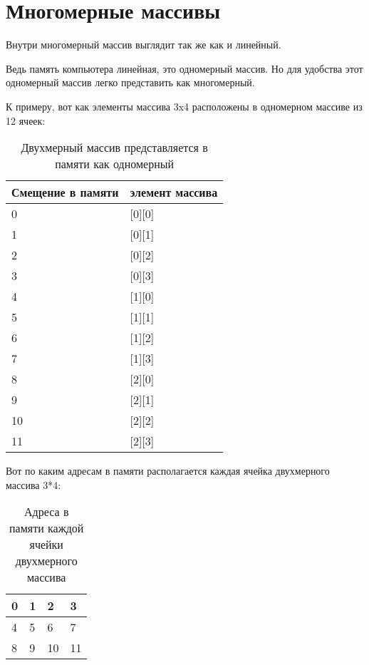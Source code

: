 \section{Многомерные массивы}

Внутри многомерный массив выглядит так же как и линейный.

Ведь память компьютера линейная, это одномерный массив.
Но для удобства этот одномерный массив легко представить как многомерный.

К примеру, вот как элементы массива 3x4 расположены в одномерном массиве из 12 ячеек:

\begin{table}[H]
\centering
\begin{tabular}{ | l | l | }
\hline
Смещение в памяти & элемент массива \\
\hline
0 & [0][0] \\
\hline
1 & [0][1] \\
\hline
2 & [0][2] \\
\hline
3 & [0][3] \\
\hline
4 & [1][0] \\
\hline
5 & [1][1] \\
\hline
6 & [1][2] \\
\hline
7 & [1][3] \\
\hline
8 & [2][0] \\
\hline
9 & [2][1] \\
\hline
10 & [2][2] \\
\hline
11 & [2][3] \\
\hline
\end{tabular}
\caption{Двухмерный массив представляется в памяти как одномерный}
\end{table}

Вот по каким адресам в памяти располагается каждая ячейка двухмерного массива 3*4:

\begin{table}[H]
\centering
\begin{tabular}{ | l | l | l | l | }
\hline                        
0 & 1 & 2 & 3 \\
\hline  
4 & 5 & 6 & 7 \\
\hline  
8 & 9 & 10 & 11 \\
\hline  
\end{tabular}
\caption{Адреса в памяти каждой ячейки двухмерного массива}
\end{table}

